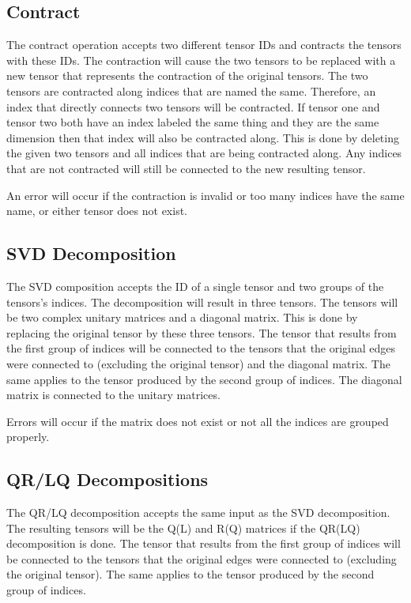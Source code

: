 \documentclass{juliacon}
\begin{document}
\begin{appendix}
\subsection{Contract}
The contract operation accepts two different tensor IDs and contracts the tensors with these IDs. The contraction will cause the two tensors to be replaced with a new tensor that represents the contraction of the original tensors. The two tensors are contracted along indices that are named the same. Therefore, an index that directly connects two tensors will be contracted. 
If tensor one and tensor two both have an index labeled the same thing and they are the same dimension then that index will also be contracted along. This is done by deleting the given two tensors and all indices that are being contracted along. Any indices that are not contracted will still be connected to the new resulting tensor.

An error will occur if the contraction is invalid or too many indices have the same name, or either tensor does not exist.

\subsection{SVD Decomposition}
The SVD composition accepts the ID of a single tensor and two groups of the tensors's indices. The decomposition will result in three tensors. The tensors will be two complex unitary matrices and a diagonal matrix. This is done by replacing the original tensor by these three tensors. The tensor that results from the first group of indices will be connected to the tensors that the original edges were connected to (excluding the original tensor) and the diagonal matrix. The same applies to the tensor produced by the second group of indices. The diagonal matrix is connected to the unitary matrices.

Errors will occur if the matrix does not exist or not all the indices are grouped properly.


\subsection{QR/LQ Decompositions}
The QR/LQ decomposition accepts the same input as the SVD decomposition. The resulting tensors will be the Q(L) and R(Q) matrices if the QR(LQ) decomposition is done.  The tensor that results from the first group of indices will be connected to the tensors that the original edges were connected to (excluding the original tensor). The same applies to the tensor produced by the second group of indices.


\end{appendix}
\end{document}
